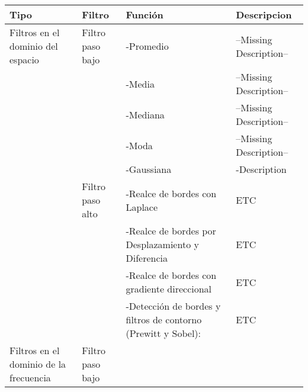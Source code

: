 \documentclass[letterpaper]{article}
\begin{document}
\begin{table}[H]

	\centering
    
	\begin{tabular}[10cm]{>{\centering\arraybackslash}m{2cm} 
    >{\centering\arraybackslash}m{2cm} 
    >{}m{5cm} 
    >{\centering\arraybackslash}m{4cm}}
		
        \toprule
        
		\large{Tipo} & \large{Filtro} & \large{Función} & \large{Descripcion} \\
        
		\midrule
        
        
        \large{Filtros en el dominio  del espacio}
        
        & Filtro paso bajo 
       
          & -Promedio & --Missing Description-- \\
        & & -Media & --Missing Description--  \\
        & & -Mediana & --Missing Description-- \\
        & & -Moda & --Missing Description--  \\
        & & -Gaussiana & -Description \\
        
        & Filtro paso alto 
        
           & -Realce de bordes con Laplace & ETC \\

		&  & -Realce de bordes por Desplazamiento y Diferencia & ETC \\
        
        &  & -Realce de bordes con gradiente direccional & ETC \\
        
        &  & -Detección de bordes y filtros de contorno (Prewitt y Sobel): & ETC \\
        
        \cmidrule{r}{2-4}
        
        \large{Filtros en el dominio de la frecuencia} & Filtro paso bajo & & \\
    	\bottomrule
	\end{tabular}
    
\end{table}
\end{document}
